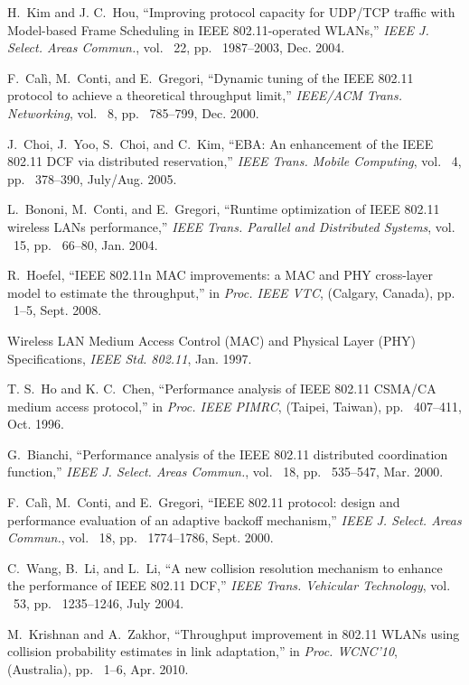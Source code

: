 \documentclass[10pt,twocolumn,oneside,submit]{JCNtran}
\begin{document}
\begin{thebibliography}{22}

H.~Kim and J. C.~Hou, ``Improving protocol capacity for UDP/TCP traffic with Model-based Frame Scheduling in IEEE 802.11-operated WLANs,'' {\em IEEE J. Select. Areas Commun.}, vol. ~22, pp. ~1987--2003, Dec. 2004.

F.~Cal{\`i}, M.~Conti, and E.~Gregori, ``Dynamic tuning of the IEEE 802.11 protocol to achieve a theoretical throughput limit,''  {\em IEEE/ACM Trans.  Networking}, vol. ~8, pp. ~785--799, Dec. 2000.

J.~Choi, J.~Yoo, S.~Choi, and C.~Kim, ``EBA: An enhancement of the IEEE 802.11 DCF via distributed reservation,'' {\em IEEE Trans. Mobile Computing}, vol. ~4, pp. ~378--390, July/Aug. 2005.

L.~Bononi, M.~Conti, and E.~Gregori, ``Runtime optimization of IEEE 802.11 wireless LANs performance,'' {\em IEEE Trans. Parallel and Distributed Systems}, vol. ~15, pp. ~66--80, Jan. 2004.

R.~Hoefel, ``IEEE 802.11n MAC improvements: a MAC and PHY cross-layer model to estimate the throughput,'' in {\em Proc. IEEE VTC}, (Calgary, Canada), pp. ~1--5, Sept. 2008.

Wireless LAN Medium Access Control (MAC) and Physical Layer (PHY) Specifications, {\em IEEE Std. 802.11}, Jan. 1997.

T. S.~Ho and K. C.~Chen, ``Performance analysis of IEEE 802.11 CSMA/CA medium access protocol,'' in {\em Proc. IEEE PIMRC}, (Taipei, Taiwan), pp. ~407--411, Oct. 1996.

G.~Bianchi, ``Performance analysis of the IEEE 802.11 distributed coordination function,'' {\em IEEE J. Select. Areas Commun.}, 
  vol. ~18, pp. ~535--547, Mar. 2000.

F.~Cal{\`i}, M.~Conti, and E.~Gregori, ``IEEE 802.11 protocol: design and performance evaluation of an adaptive backoff mechanism,'' {\em IEEE J. Select. Areas Commun.}, vol. ~18, pp. ~1774--1786, Sept. 2000.

C.~Wang, B.~Li, and L.~Li, ``A new collision resolution mechanism to enhance the performance of IEEE 802.11 DCF,'' {\em IEEE Trans. Vehicular Technology}, vol. ~53, pp. ~1235--1246, July 2004.

M.~Krishnan and A.~Zakhor, ``Throughput improvement in 802.11 WLANs using collision probability estimates in link adaptation,'' in {\em Proc. WCNC'10}, (Australia), pp. ~1--6, Apr. 2010.


\end{thebibliography}
\end{document}
